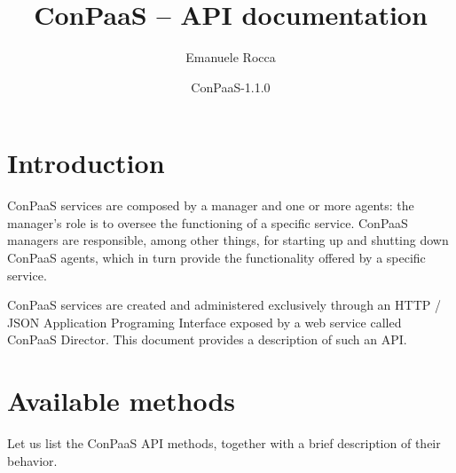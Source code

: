 \documentclass[10pt]{article}
\title{ConPaaS -- API documentation\htmlonly{ [\xml{a href="api.pdf"}pdf\xml{/a}]}}
\author{Emanuele Rocca}
\date{ConPaaS-1.1.0}
\begin{document}
\maketitle


\section{Introduction}
\label{intro}
ConPaaS services are composed by a manager and one or more agents: the
manager's role is to oversee the functioning of a specific service. ConPaaS
managers are responsible, among other things, for starting up and shutting down
ConPaaS agents, which in turn provide the functionality offered by a specific
service.

ConPaaS services are created and administered exclusively through an HTTP /
JSON Application Programing Interface exposed by a web service called ConPaaS
Director. This document provides a description of such an API.

\pagebreak 

\section{Available methods}
Let us list the ConPaaS API methods, together with a brief description of their
behavior.
\end{document}
